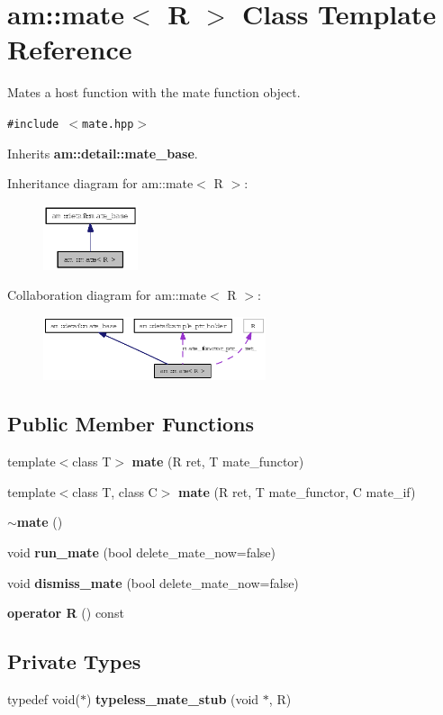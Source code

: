 \section{am::mate$<$ R $>$ Class Template Reference}
\label{classam_1_1mate}
Mates a host function with the mate function object.  


{\tt \#include $<$mate.hpp$>$}

Inherits {\bf am::detail::mate\_\-base}.

Inheritance diagram for am::mate$<$ R $>$:\begin{figure}[H]
\begin{center}
\leavevmode
\includegraphics[width=79pt]{classam_1_1mate__inherit__graph}
\end{center}
\end{figure}
Collaboration diagram for am::mate$<$ R $>$:\begin{figure}[H]
\begin{center}
\leavevmode
\includegraphics[width=185pt]{classam_1_1mate__coll__graph}
\end{center}
\end{figure}
\subsection*{Public Member Functions}
\begin{CompactItemize}
\item 
template$<$class T$>$ {\bf mate} (R ret, T mate\_\-functor)
\item 
template$<$class T, class C$>$ {\bf mate} (R ret, T mate\_\-functor, C mate\_\-if)
\item 
{\bf $\sim$mate} ()
\item 
void {\bf run\_\-mate} (bool delete\_\-mate\_\-now=false)
\item 
void {\bf dismiss\_\-mate} (bool delete\_\-mate\_\-now=false)
\item 
{\bf operator R} () const
\end{CompactItemize}
\subsection*{Private Types}
\begin{CompactItemize}
\item 
typedef void($\ast$) \textbf{typeless\_\-mate\_\-stub} (void $\ast$, R)\label{classam_1_1mate_ee9347452cd87f7f0fc174ee8eece9de}

\end{CompactItemize}
